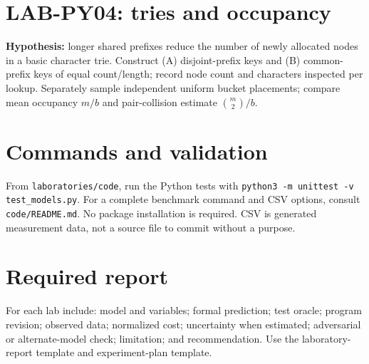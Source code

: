 \documentclass[11pt]{article}
\begin{document}
\section{LAB-PY04: tries and occupancy}
\textbf{Hypothesis:} longer shared prefixes reduce the number of newly allocated nodes in a basic character trie. Construct (A) disjoint-prefix keys and (B) common-prefix keys of equal count/length; record node count and characters inspected per lookup. Separately sample independent uniform bucket placements; compare mean occupancy $m/b$ and pair-collision estimate $\binom m2/b$.
\section{Commands and validation}
From \texttt{laboratories/code}, run the Python tests with \texttt{python3 -m unittest -v test\_models.py}. For a complete benchmark command and CSV options, consult \texttt{code/README.md}. No package installation is required. CSV is generated measurement data, not a source file to commit without a purpose.
\section{Required report}
For each lab include: model and variables; formal prediction; test oracle; program revision; observed data; normalized cost; uncertainty when estimated; adversarial or alternate-model check; limitation; and recommendation. Use the laboratory-report template and experiment-plan template.
\end{document}
